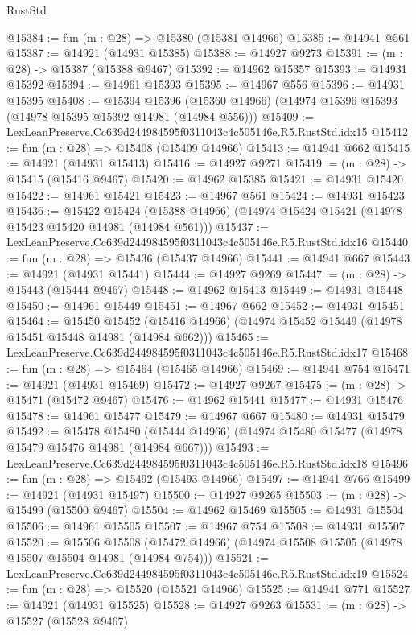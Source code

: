 \begin{lexlean}{RustStd}
\begin{coremodule}
@15384 := fun (m : @28) => @15380 (@15381 @14966)
@15385 := @14941 @561
@15387 := @14921 (@14931 @15385)
@15388 := @14927 @9273
@15391 := (m : @28) -> @15387 (@15388 @9467)
@15392 := @14962 @15357
@15393 := @14931 @15392
@15394 := @14961 @15393
@15395 := @14967 @556
@15396 := @14931 @15395
@15408 := @15394
    @15396
    (@15360 @14966)
    (@14974 @15396 @15393 (@14978 @15395 @15392 @14981 (@14984 @556)))
@15409 := LexLeanPreserve.Cc639d244984595f0311043c4c505146e.R5.RustStd.idx15
@15412 := fun (m : @28) => @15408 (@15409 @14966)
@15413 := @14941 @662
@15415 := @14921 (@14931 @15413)
@15416 := @14927 @9271
@15419 := (m : @28) -> @15415 (@15416 @9467)
@15420 := @14962 @15385
@15421 := @14931 @15420
@15422 := @14961 @15421
@15423 := @14967 @561
@15424 := @14931 @15423
@15436 := @15422
    @15424
    (@15388 @14966)
    (@14974 @15424 @15421 (@14978 @15423 @15420 @14981 (@14984 @561)))
@15437 := LexLeanPreserve.Cc639d244984595f0311043c4c505146e.R5.RustStd.idx16
@15440 := fun (m : @28) => @15436 (@15437 @14966)
@15441 := @14941 @667
@15443 := @14921 (@14931 @15441)
@15444 := @14927 @9269
@15447 := (m : @28) -> @15443 (@15444 @9467)
@15448 := @14962 @15413
@15449 := @14931 @15448
@15450 := @14961 @15449
@15451 := @14967 @662
@15452 := @14931 @15451
@15464 := @15450
    @15452
    (@15416 @14966)
    (@14974 @15452 @15449 (@14978 @15451 @15448 @14981 (@14984 @662)))
@15465 := LexLeanPreserve.Cc639d244984595f0311043c4c505146e.R5.RustStd.idx17
@15468 := fun (m : @28) => @15464 (@15465 @14966)
@15469 := @14941 @754
@15471 := @14921 (@14931 @15469)
@15472 := @14927 @9267
@15475 := (m : @28) -> @15471 (@15472 @9467)
@15476 := @14962 @15441
@15477 := @14931 @15476
@15478 := @14961 @15477
@15479 := @14967 @667
@15480 := @14931 @15479
@15492 := @15478
    @15480
    (@15444 @14966)
    (@14974 @15480 @15477 (@14978 @15479 @15476 @14981 (@14984 @667)))
@15493 := LexLeanPreserve.Cc639d244984595f0311043c4c505146e.R5.RustStd.idx18
@15496 := fun (m : @28) => @15492 (@15493 @14966)
@15497 := @14941 @766
@15499 := @14921 (@14931 @15497)
@15500 := @14927 @9265
@15503 := (m : @28) -> @15499 (@15500 @9467)
@15504 := @14962 @15469
@15505 := @14931 @15504
@15506 := @14961 @15505
@15507 := @14967 @754
@15508 := @14931 @15507
@15520 := @15506
    @15508
    (@15472 @14966)
    (@14974 @15508 @15505 (@14978 @15507 @15504 @14981 (@14984 @754)))
@15521 := LexLeanPreserve.Cc639d244984595f0311043c4c505146e.R5.RustStd.idx19
@15524 := fun (m : @28) => @15520 (@15521 @14966)
@15525 := @14941 @771
@15527 := @14921 (@14931 @15525)
@15528 := @14927 @9263
@15531 := (m : @28) -> @15527 (@15528 @9467)

\end{coremodule}
\end{lexlean}
